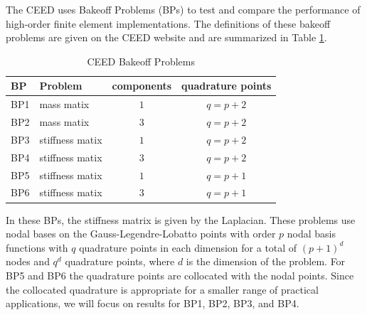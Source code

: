 The CEED uses Bakeoff Problems (BPs) to test and compare the performance of high-order finite element implementations.
The definitions of these bakeoff problems are given on the CEED website \cite{ceed-bps} and are summarized in Table \ref{table:ceedbps}.

\begin{table}[ht!]
\begin{center}
\begin{tabular}{l l c c}
  \toprule
  BP  & Problem         & components & quadrature points  \\
  \toprule
  BP1 & mass matix      & $1$        & $q = p + 2$        \\
  BP2 & mass matix      & $3$        & $q = p + 2$        \\
  \midrule
  BP3 & stiffness matix & $1$        & $q = p + 2$        \\
  BP4 & stiffness matix & $3$        & $q = p + 2$        \\
  \midrule
  BP5 & stiffness matix & $1$        & $q = p + 1$        \\
  BP6 & stiffness matix & $3$        & $q = p + 1$        \\
  \bottomrule
\end{tabular}
\end{center}
\caption{CEED Bakeoff Problems}
\label{table:ceedbps}
\end{table}

In these BPs, the stiffness matrix is given by the Laplacian.
These problems use nodal bases on the Gauss-Legendre-Lobatto points with order $p$ nodal basis functions with $q$ quadrature points in each dimension for a total of $\left( p + 1 \right)^d$ nodes and $q^d$ quadrature points, where $d$ is the dimension of the problem.
For BP5 and BP6 the quadrature points are collocated with the nodal points.
Since the collocated quadrature is appropriate for a smaller range of practical applications, we will focus on results for BP1, BP2, BP3, and BP4.

